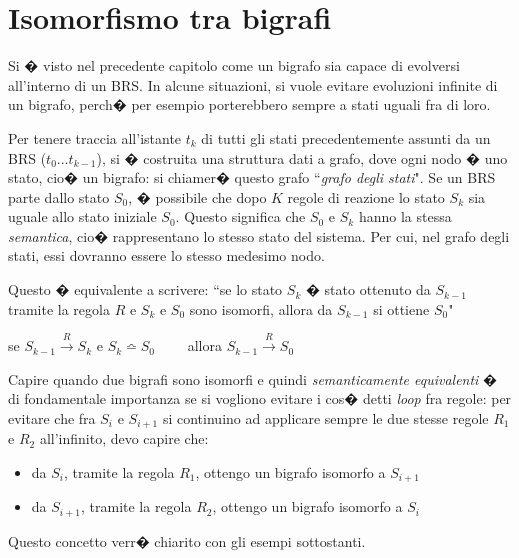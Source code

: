 \chapter{Isomorfismo tra bigrafi}\label{ch:isoChapter}
Si � visto nel precedente capitolo come un bigrafo sia capace di evolversi all'interno di un BRS. In alcune situazioni, si vuole evitare evoluzioni infinite di un bigrafo, perch�
per esempio porterebbero sempre a stati uguali fra di loro.

Per tenere traccia all'istante $t_k$ di tutti gli stati precedentemente assunti da un BRS ($t_0 \dots t_{k-1}$), si � costruita una struttura dati a grafo, dove ogni nodo
� uno stato, cio� un bigrafo: si chiamer� questo grafo  ``\emph{grafo degli stati}". Se un BRS parte dallo stato $S_0$, � possibile che dopo $K$ regole di reazione lo stato $S_k$ sia uguale allo stato iniziale $S_0$. Questo significa che $S_0$ e $S_k$ hanno la stessa \emph{semantica}, cio� rappresentano lo stesso stato del sistema. Per cui, nel grafo degli stati, essi dovranno essere lo stesso medesimo nodo.

Questo � equivalente a scrivere: ``se lo stato $S_{k}$ � stato ottenuto da $S_{k-1}$ tramite la regola $R$ e $S_k$ e $S_0$ sono isomorfi, allora da $S_{k-1}$ si ottiene
$S_0$"
\begin{center}
se $S_{k-1}\stackrel{R}{\longrightarrow}S_{k}$ e $ S_k \bumpeq S_0 \qquad$ allora $S_{k-1}\stackrel{R}{\longrightarrow}S_{0}$
\end{center}
Capire quando due bigrafi sono isomorfi e quindi \emph{semanticamente equivalenti} � di fondamentale importanza se si vogliono evitare i cos� detti \emph{loop} fra regole: per evitare che fra $S_{i}$ e $S_{i+1}$ si continuino ad applicare sempre le due stesse regole $R_1$ e $R_2$ all'infinito, devo capire che:
\begin{itemize} 
	\item
	da $S_{i}$, tramite la regola $R_1$, ottengo un bigrafo isomorfo a $S_{i+1}$
	\item
	da $S_{i+1}$, tramite la regola $R_2$, ottengo un bigrafo isomorfo a $S_{i}$
\end{itemize}
Questo concetto verr� chiarito con gli esempi sottostanti.

